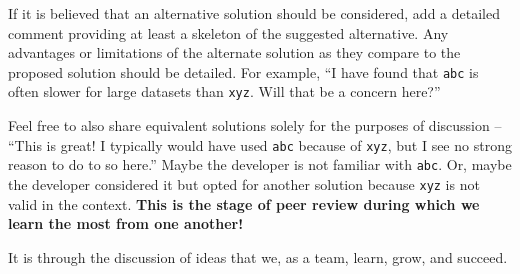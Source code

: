 \documentclass[
]{book}
\begin{document}
If it is believed that an alternative solution should be considered, add a detailed comment providing at least a skeleton of the suggested alternative. Any advantages or limitations of the alternate solution as they compare to the proposed solution should be detailed. For example, ``I have found that \texttt{abc} is often slower for large datasets than \texttt{xyz}. Will that be a concern here?''

Feel free to also share equivalent solutions solely for the purposes of discussion -- ``This is great! I typically would have used \texttt{abc} because of \texttt{xyz}, but I see no strong reason to do to so here.'' Maybe the developer is not familiar with \texttt{abc}. Or, maybe the developer considered it but opted for another solution because \texttt{xyz} is not valid in the context. \textbf{This is the stage of peer review during which we learn the most from one another!}

It is through the discussion of ideas that we, as a team, learn, grow, and succeed.

  
\end{document}
